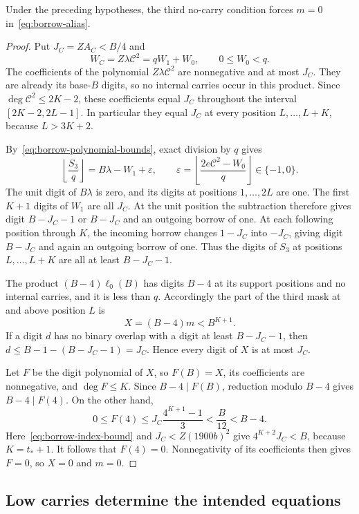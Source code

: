 \begin{lemma}\label{lem:borrow-high-window}
Under the preceding hypotheses, the third no-carry condition forces
$m=0$ in~\eqref{eq:borrow-alias}.
\end{lemma}
\begin{proof}
Put $J_C=ZA_C<B/4$ and
\[
 W_C=Z\lambda\mathcal C^2=qW_1+W_0,
 \qquad0\le W_0<q.
\]
The coefficients of the polynomial $Z\lambda\mathcal C^2$ are
nonnegative and at most $J_C$. They are already its base-$B$ digits,
so no internal carries occur in this product. Since
$\deg\mathcal C^2\le2K-2$, these coefficients equal $J_C$ throughout
the interval $[2K-2,2L-1]$. In particular they equal $J_C$ at every
position $L,\ldots,L+K$, because $L>3K+2$.

By~\eqref{eq:borrow-polynomial-bounds}, exact division by $q$ gives
\[
 \left\lfloor\frac{S_3}{q}\right\rfloor
  =B\lambda-W_1+\varepsilon,
 \qquad
 \varepsilon=\left\lfloor
   \frac{2e\mathcal C^2-W_0}{q}\right\rfloor\in\{-1,0\}.
\]
The unit digit of $B\lambda$ is zero, and its digits at positions
$1,\ldots,2L$ are one. The first $K+1$ digits of $W_1$ are all
$J_C$. At the unit position the subtraction therefore gives digit
$B-J_C-1$ or $B-J_C$ and an outgoing borrow of one. At each following
position through $K$, the incoming borrow changes $1-J_C$ into
$-J_C$, giving digit $B-J_C$ and again an outgoing borrow of one.
Thus the digits of $S_3$ at positions $L,\ldots,L+K$ are all at least
$B-J_C-1$.

The product $(B-4)\ell_0(B)$ has digits $B-4$ at its support
positions and no internal carries, and it is less than $q$.
Accordingly the part of the third mask at and above position $L$ is
\[
 X=(B-4)m<B^{K+1}.
\]
If a digit $d$ has no binary overlap with a digit at least
$B-J_C-1$, then
$d\le B-1-(B-J_C-1)=J_C$.
Hence every digit of $X$ is at most $J_C$.

Let $F$ be the digit polynomial of $X$, so $F(B)=X$, its coefficients
are nonnegative, and $\deg F\le K$. Since $B-4\mid F(B)$, reduction
modulo $B-4$ gives $B-4\mid F(4)$. On the other hand,
\[
 0\le F(4)\le J_C\frac{4^{K+1}-1}{3}
       <\frac{B}{12}<B-4.
\]
Here~\eqref{eq:borrow-index-bound} and
$J_C<Z(1900b)^2$ give
$4^{K+2}J_C<B$, because $K=t_*+1$.
It follows that $F(4)=0$. Nonnegativity of its coefficients then
gives $F=0$, so $X=0$ and $m=0$.
\end{proof}

\subsection{Low carries determine the intended equations}

